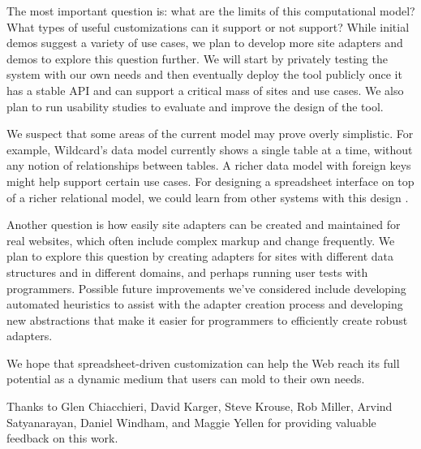 \documentclass[english,submission]{programming}
\begin{document}
The most important question is: what are the limits of this
computational model? What types of useful customizations can it support
or not support? While initial demos suggest a variety of use cases, we
plan to develop more site adapters and demos to explore this question
further. We will start by privately testing the system with our own
needs and then eventually deploy the tool publicly once it has a stable
API and can support a critical mass of sites and use cases. We also plan
to run usability studies to evaluate and improve the design of the tool.

We suspect that some areas of the current model may prove overly
simplistic. For example, Wildcard's data model currently shows a single
table at a time, without any notion of relationships between tables. A
richer data model with foreign keys might help support certain use
cases. For designing a spreadsheet interface on top of a richer
relational model, we could learn from other systems with this design
\autocite{mccutchen2016,bakke2016}.

Another question is how easily site adapters can be created and
maintained for real websites, which often include complex markup and
change frequently. We plan to explore this question by creating adapters
for sites with different data structures and in different domains, and
perhaps running user tests with programmers. Possible future
improvements we've considered include developing automated heuristics to
assist with the adapter creation process and developing new abstractions
that make it easier for programmers to efficiently create robust
adapters.

We hope that spreadsheet-driven customization can help the Web reach its
full potential as a dynamic medium that users can mold to their own
needs.

\acks
Thanks to Glen Chiacchieri, David Karger, Steve Krouse, Rob Miller, Arvind Satyanarayan, Daniel Windham, and Maggie Yellen for providing valuable feedback on this work.

\printbibliography
\end{document}
